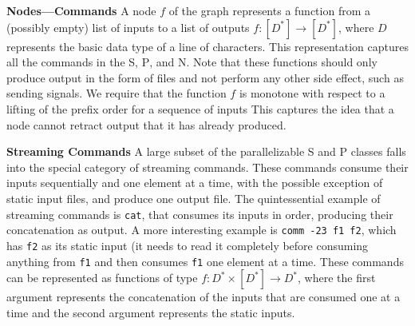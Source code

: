 \documentclass[letterpaper,twocolumn,10pt]{article}
\newcommand{\heading}[1]{\vspace{4pt}\noindent\textbf{#1}\enspace}
\newcommand{\ttt}[1]{\texttt{#1}}
\newcommand{\cn}[1]{\mbox{\textcircled{\footnotesize #1}}}
\newcommand{\tcn}[1]{\mbox{\textcircled{\scriptsize #1}}}
\newcommand{\sta}{\cn{\textsc{S}}\xspace}
\newcommand{\pur}{\cn{\textsc{P}}\xspace}
\newcommand{\tsta}{\tcn{\textsc{S}}\xspace}
\newcommand{\tpur}{\tcn{\textsc{P}}\xspace}
\newcommand{\tnpu}{\tcn{\textsc{N}}\xspace}
\newcommand{\nv}[1]{[{\color{cyan}nv: #1}]}
\newcommand{\kk}[1]{[{\color{magenta}kk: #1}]}
\newcommand{\km}[1]{[{\color{blue}km: #1}]}
\newcommand{\kstar}{^{\textstyle *}}
\begin{document}
\heading{Nodes---Commands}
A node $f$ of the graph represents a function from a (possibly empty)
list of inputs
to a list of outputs
$f : [D\kstar] \to [D\kstar]$, where $D$ represents the basic data
type of a line of characters.
This representation captures all the commands in
the \tsta, \tpur, and \tnpu. Note that these functions should only produce
output in the form of files and not perform any other side effect,
such as sending signals.  We require that the function $f$ is monotone
with respect to a lifting of the prefix order for a sequence of inputs
This captures the idea that a node cannot retract output that it has
already produced.

\heading{Streaming Commands}
%
A large subset of the parallelizable \tsta and \tpur classes falls
into the special category of streaming commands. These commands
consume their inputs sequentially and one element at a time, with the
possible exception of static input files, and produce one output
file. The quintessential example of streaming commands is \ttt{cat},
that consumes its inputs in order, producing their concatenation as
output. A more interesting example is \ttt{comm -23 f1 f2}, which has
\ttt{f2} as its static input (it needs to read it completely before
consuming anything from \ttt{f1} and then consumes \ttt{f1} one
element at a time. These commands can be represented as functions of
type $f : D\kstar \times [D\kstar] \to D\kstar$, where the first
argument represents the concatenation of the inputs that are consumed
one at a time and the second argument represents the static inputs.
\end{document}
